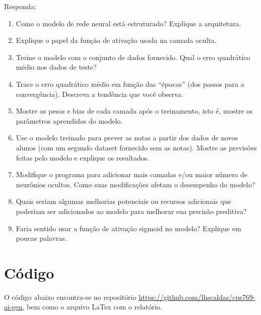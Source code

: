 \documentclass[12 pt]{article}
\begin{document}
Responda:

\begin{enumerate}
    \item Como o modelo de rede neural está estruturado? Explique a arquitetura.
    \item Explique o papel da função de ativação usada na camada oculta.
    \item Treine o modelo com o conjunto de dados fornecido. Qual o erro quadrático médio nos dados de teste?
    \item Trace o erro quadrático médio em função das “épocas” (dos passos para a convergência). Descreva a tendência que você observa.
    \item Mostre os pesos e bias de cada camada após o treinamento, isto é, mostre os parâmetros aprendidos do modelo.
    \item Use o modelo treinado para prever as notas a partir dos dados de novos alunos (com um segundo dataset fornecido sem as notas). Mostre as previsões feitas pelo modelo e explique os resultados.
    \item Modifique o programa para adicionar mais camadas e/ou maior número de neurônios ocultos. Como suas modificações afetam o desempenho do modelo?
    \item Quais seriam algumas melhorias potenciais ou recursos adicionais que poderiam ser adicionados ao modelo para melhorar sua precisão preditiva?
    \item Faria sentido usar a função de ativação sigmoid no modelo? Explique em poucas palavras.
\end{enumerate}

\section*{Código}

O código abaixo encontra-se no repositório \href{https://github.com/lhscaldas/cps769-ai-gen}{https://github.com/lhscaldas/cps769-ai-gen}, bem como o arquivo LaTex com o relatório.



\end{document}

